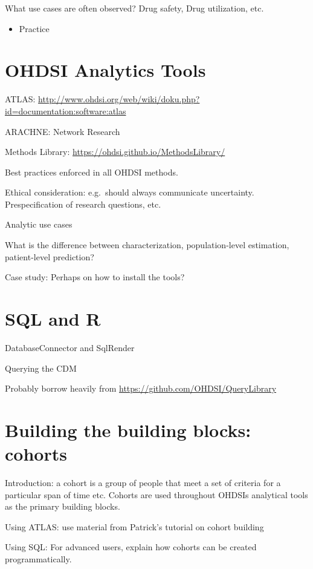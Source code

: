 \documentclass[]{book}
\providecommand{\tightlist}{%
  \setlength{\itemsep}{0pt}\setlength{\parskip}{0pt}}
\begin{document}
What use cases are often observed? Drug safety, Drug utilization, etc.

\begin{itemize}
\tightlist
\item
  Practice
\end{itemize}

\chapter{OHDSI Analytics Tools}\label{OhdsiAnalyticsTools}

ATLAS:
\url{http://www.ohdsi.org/web/wiki/doku.php?id=documentation:software:atlas}

ARACHNE: Network Research

Methods Library: \url{https://ohdsi.github.io/MethodsLibrary/}

Best practices enforced in all OHDSI methods.

Ethical consideration: e.g.~should always communicate uncertainty.
Prespecification of research questions, etc.

Analytic use cases

What is the difference between characterization, population-level
estimation, patient-level prediction?

Case study: Perhaps on how to install the tools?

\chapter{SQL and R}\label{SqlAndR}

DatabaseConnector and SqlRender

Querying the CDM

Probably borrow heavily from \url{https://github.com/OHDSI/QueryLibrary}

\chapter{Building the building blocks: cohorts}\label{Cohorts}

Introduction: a cohort is a group of people that meet a set of criteria
for a particular span of time etc. Cohorts are used throughout OHDSIs
analytical tools as the primary building blocks.

Using ATLAS: use material from Patrick's tutorial on cohort building

Using SQL: For advanced users, explain how cohorts can be created
programmatically.
\end{document}
